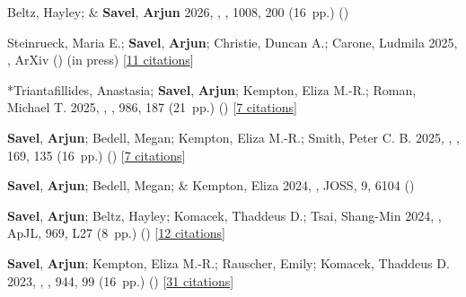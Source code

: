 \item[{\color{numcolor}\scriptsize10}] Beltz, Hayley; \& \textbf{Savel}, \textbf{Arjun} 2026, , \apj, {1008}, 200 (16~pp.) ()

\item[{\color{numcolor}\scriptsize9}] Steinrueck, Maria E.; \textbf{Savel}, \textbf{Arjun}; Christie, Duncan A.; Carone, Ludmila \etal{} 2025, , ArXiv () (in press) [\href{https://ui.adsabs.harvard.edu/abs/2025arXiv250921588S}{11 citations}]

\item[{\color{numcolor}\scriptsize8}] *Triantafillides, Anastasia; \textbf{Savel}, \textbf{Arjun}; Kempton, Eliza M.-R.; Roman, Michael T. \etal{} 2025, , \apj, {986}, 187 (21~pp.) () [\href{https://ui.adsabs.harvard.edu/abs/2025ApJ...986..187A}{7 citations}]

\item[{\color{numcolor}\scriptsize7}] \textbf{Savel}, \textbf{Arjun}; Bedell, Megan; Kempton, Eliza M.-R.; Smith, Peter C. B. \etal{} 2025, , \aj, {169}, 135 (16~pp.) () [\href{https://ui.adsabs.harvard.edu/abs/2025AJ....169..135S}{7 citations}]

\item[{\color{numcolor}\scriptsize6}] \textbf{Savel}, \textbf{Arjun}; Bedell, Megan; \& Kempton, Eliza 2024, , JOSS, {9}, 6104 ()

\item[{\color{numcolor}\scriptsize5}] \textbf{Savel}, \textbf{Arjun}; Beltz, Hayley; Komacek, Thaddeus D.; Tsai, Shang-Min \etal{} 2024, , ApJL, {969}, L27 (8~pp.) () [\href{https://ui.adsabs.harvard.edu/abs/2024ApJ...969L..27S}{12 citations}]

\item[{\color{numcolor}\scriptsize4}] \textbf{Savel}, \textbf{Arjun}; Kempton, Eliza M.-R.; Rauscher, Emily; Komacek, Thaddeus D. \etal{} 2023, , \apj, {944}, 99 (16~pp.) () [\href{https://ui.adsabs.harvard.edu/abs/2023ApJ...944...99S}{31 citations}]

